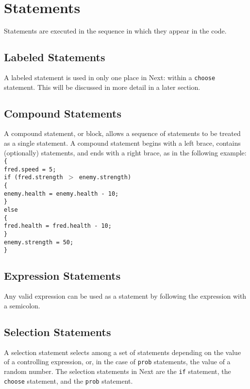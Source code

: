 \documentclass[12pt]{article}
\begin{document}
\section{Statements}
Statements are executed in the sequence in which they appear in the code.

\subsection{Labeled Statements}
A labeled statement is used in only one place in Next: within a \texttt{choose} statement.  This will be discussed in more detail in a later section.

\subsection{Compound Statements}
A compound statement, or block, allows a sequence of statements to be treated as a single statement.  A compound statement begins with a left brace, contains (optionally) statements, and ends with a right brace, as in the following example: \\

\noindent \texttt{\{ \\
\indent fred.speed = 5; \\
\indent if (fred.strength $>$ enemy.strength) \\
\indent \{ \\
\indent \indent enemy.health = enemy.health - 10;  \\
\indent \} \\
\indent else \\
\indent \{ \\
\indent \indent fred.health = fred.health - 10; \\
\indent \} \\
\indent enemy.strength = 50; \\
\} }

\subsection{Expression Statements}
Any valid expression can be used as a statement by following the expression with a semicolon.

\subsection{Selection Statements}
A selection statement selects among a set of statements depending on the value of a controlling expression, or, in the case of \texttt{prob} statements, the value of a random number.  The selection statements in Next are the \texttt{if} statement, the \texttt{choose} statement, and the \texttt{prob} statement.
\end{document}
